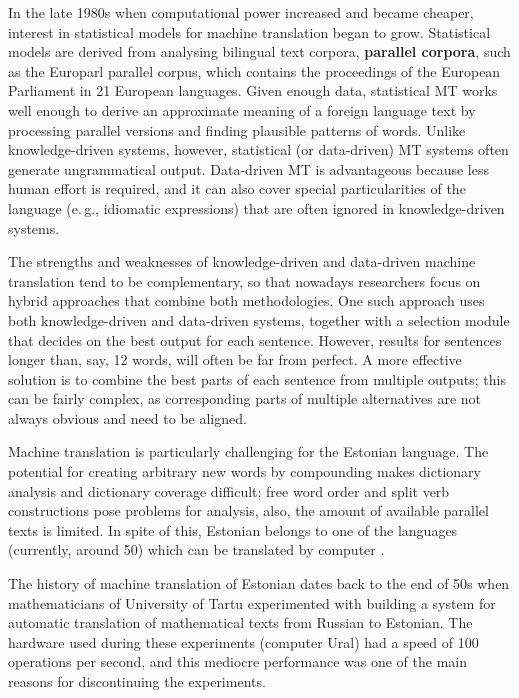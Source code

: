 \begin{multicols}{2}
In the late 1980s when computational power increased and became cheaper, interest in statistical models for machine translation began to grow. Statistical models are derived from analysing bilingual text corpora, \textbf{parallel corpora}, such as the Europarl parallel corpus, which contains the proceedings of the European Parliament in 21 European languages. Given enough data, statistical MT works well enough to derive an approximate meaning of a foreign language text by processing parallel versions and finding plausible patterns of words. Unlike knowledge-driven systems, however, statistical (or data-driven) MT systems often generate ungrammatical output. Data-driven MT is advantageous because less human effort is required, and it can also cover special particularities of the language (e.\,g., idiomatic expressions) that are often ignored in knowledge-driven systems. 

The strengths and weaknesses of knowledge-driven and data-driven machine translation tend to be complementary, so that nowadays researchers focus on hybrid approaches that combine both methodologies. One such approach uses both knowledge-driven and data-driven systems, together with a selection module that decides on the best output for each sentence. However, results for sentences longer than, say, 12 words, will often be far from perfect. A more effective solution is to combine the best parts of each sentence from multiple outputs; this can be fairly complex, as corresponding parts of multiple alternatives are not always obvious and need to be aligned. 


Machine translation is particularly challenging for the Estonian language. 
The potential for creating arbitrary new words by compounding makes dictionary analysis and dictionary coverage difficult; free word order and split verb constructions pose problems for analysis, also, the amount of available parallel texts is limited. 
In spite of this, Estonian belongs to one of the languages (currently, around 50) which can be translated by computer \cite{Koit}. 

The history of machine translation of Estonian dates back to the end of 50s when mathematicians of University of Tartu experimented with building a system for automatic translation of mathematical texts from Russian to Estonian. 
The hardware used during these experiments (computer Ural) had a speed of 100 operations per second, and this mediocre performance was one of the main reasons for discontinuing the experiments.


\end{multicols}
